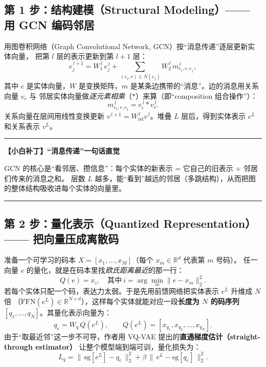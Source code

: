 \documentclass[11pt,UTF8,fontset=fandol]{ctexart}
\newenvironment{tip}[1]{%
  \par\smallskip\noindent\rule{\linewidth}{0.4pt}\par\nobreak
  \noindent\textbf{【小白补丁】#1}\par\nobreak\noindent\ignorespaces
}{%
  \par\noindent\rule{\linewidth}{0.4pt}\par\smallskip
}
\begin{document}
\subsection{第 1 步：结构建模（Structural Modeling）—— 用 GCN 编码邻居}
用图卷积网络（Graph Convolutional Network, GCN）按“消息传递”逐层更新实体向量，
把第 $l$ 层的表示更新到第 $l{+}1$ 层：
\begin{equation*}
  e_j^{\,l+1}=W_1^{\,l}\,e_j^{\,l}+\!\!\sum_{(e_i,r)\in N(e_j)}\!\!W_2^{\,l}\,m_{e_i,r,e_j}^{\,l},
  \tag{1}
\end{equation*}
其中 $e$ 是实体向量，$W$ 是变换矩阵，$m$ 是某条边携带的“消息”。边的消息用关系向量 $v_r$ 与
邻居实体向量做\emph{逐元素相乘}（$\ast$）来算（即“composition 组合操作”）：
\begin{equation*}
  m_{e_i,r,e_j}^{\,l}=e_i^{\,l}\ast v_r^{\,l}.\tag{2}
\end{equation*}
关系向量在层间用线性变换更新 $v^{\,l+1}=W_{\text{rel}}^{\,l}v^{\,l}$。堆叠 $L$ 层后，得到实体表示
$e^L$ 和关系表示 $v^L$。

\begin{tip}{“消息传递”一句话直觉}
GCN 的核心是“看邻居、攒信息”：每个实体的新表示 = 它自己的旧表示 + 邻居们传来的消息之和。
层数 $L$ 越多，能“看到”越远的邻居（多跳结构），从而把图的整体结构吸收进每个实体的向量里。
\end{tip}

\subsection{第 2 步：量化表示（Quantized Representation）—— 把向量压成离散码}
准备一个可学习的码本 $X=[x_1,\dots,x_M]$（每个 $x_m\in\mathbb{R}^d$ 代表第 $m$ 号码）。
任一向量 $e$ 的量化，就是在码本里找\emph{欧氏距离最近}的那一行：
\begin{equation*}
  Q(e)=x_i,\quad \text{其中}\ i=\arg\min_{m}\|e-x_m\|_2^2.\tag{3}
\end{equation*}
若每个实体只配一个码，表达力太弱。于是先用前馈网络把实体表示 $e^L$ 升维成 $N$ 倍
（$\mathrm{FFN}(e^L)\in\mathbb{R}^{N\times d}$），这样每个实体就能对应一段\textbf{长度为 $N$ 的码序列}
$[q_1,\dots,q_N]$。其量化表示向量为：
\begin{equation*}
  q_e=W_q\,Q(e^L),\qquad Q(e^L)=[x_{q_1},x_{q_2},\dots,x_{q_N}].\tag{4}
\end{equation*}
由于“取最近邻”这一步不可导，作者用 VQ-VAE 提出的\textbf{直通梯度估计（straight-through estimator）}
让整个模型端到端可训，量化损失为：
\begin{equation*}
  L_q=\big\|\,\mathrm{sg}[e^L]-q_e\,\big\|_2^2+\beta\,\big\|\,e^L-\mathrm{sg}[q_e]\,\big\|_2^2.\tag{5}
\end{equation*}
\end{document}
